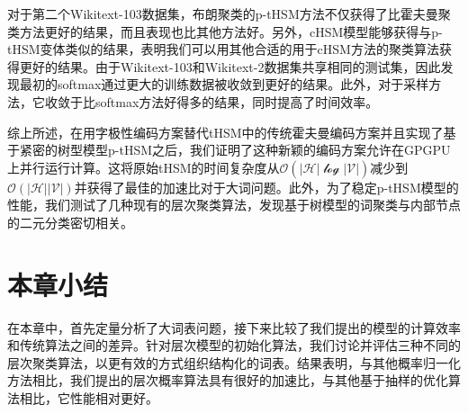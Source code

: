 对于第二个Wikitext-103数据集，布朗聚类的p-tHSM方法不仅获得了比霍夫曼聚类方法更好的结果，而且表现也比其他方法好。另外，cHSM模型能够获得与p-tHSM变体类似的结果，表明我们可以用其他合适的用于cHSM方法的聚类算法获得更好的结果。由于Wikitext-103和Wikitext-2数据集共享相同的测试集，因此发现最初的softmax通过更大的训练数据被收敛到更好的结果。此外，对于采样方法，它收敛于比softmax方法好得多的结果，同时提高了时间效率。

综上所述，在用字极性编码方案替代tHSM中的传统霍夫曼编码方案并且实现了基于紧密的树型模型p-tHSM之后，我们证明了这种新颖的编码方案允许在GPGPU上并行运行计算。这将原始tHSM的时间复杂度从$ \mathcal {O(| H | \log | V |)} $减少到$\mathcal{O(| H || V |)} $并获得了最佳的加速比对于大词问题。此外，为了稳定p-tHSM模型的性能，我们测试了几种现有的层次聚类算法，发现基于树模型的词聚类与内部节点的二元分类密切相关。

\section{本章小结}

在本章中，首先定量分析了大词表问题，接下来比较了我们提出的模型的计算效率和传统算法之间的差异。针对层次模型的初始化算法，我们讨论并评估三种不同的层次聚类算法，以更有效的方式组织结构化的词表。结果表明，与其他概率归一化方法相比，我们提出的层次概率算法具有很好的加速比，与其他基于抽样的优化算法相比，它性能相对更好。

